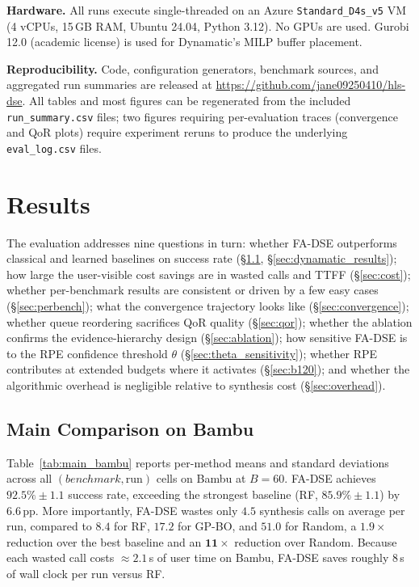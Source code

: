 \documentclass[journal]{IEEEtran}
\begin{document}
\textbf{Hardware.} All runs execute single-threaded on an Azure \texttt{Standard\_D4s\_v5} VM (4 vCPUs, 15\,GB RAM, Ubuntu 24.04, Python 3.12). No GPUs are used. Gurobi 12.0 (academic license) is used for Dynamatic's MILP buffer placement.

\textbf{Reproducibility.} Code, configuration generators, benchmark sources, and aggregated run summaries are released at \url{https://github.com/jane09250410/hls-dse}. All tables and most figures can be regenerated from the included \texttt{run\_summary.csv} files; two figures requiring per-evaluation traces (convergence and QoR plots) require experiment reruns to produce the underlying \texttt{eval\_log.csv} files.


\section{Results}
\label{sec:results}

The evaluation addresses nine questions in turn: whether FA-DSE outperforms classical and learned baselines on success rate (\S\ref{sec:main_results}, \S\ref{sec:dynamatic_results}); how large the user-visible cost savings are in wasted calls and TTFF (\S\ref{sec:cost}); whether per-benchmark results are consistent or driven by a few easy cases (\S\ref{sec:perbench}); what the convergence trajectory looks like (\S\ref{sec:convergence}); whether queue reordering sacrifices QoR quality (\S\ref{sec:qor}); whether the ablation confirms the evidence-hierarchy design (\S\ref{sec:ablation}); how sensitive FA-DSE is to the RPE confidence threshold $\theta$ (\S\ref{sec:theta_sensitivity}); whether RPE contributes at extended budgets where it activates (\S\ref{sec:b120}); and whether the algorithmic overhead is negligible relative to synthesis cost (\S\ref{sec:overhead}).

\subsection{Main Comparison on Bambu}
\label{sec:main_results}

Table~\ref{tab:main_bambu} reports per-method means and standard deviations across all $(benchmark, \text{run})$ cells on Bambu at $B{=}60$. FA-DSE achieves $92.5\% \pm 1.1$ success rate, exceeding the strongest baseline (RF, $85.9\% \pm 1.1$) by $6.6$\,pp. More importantly, FA-DSE wastes only $4.5$ synthesis calls on average per run, compared to $8.4$ for RF, $17.2$ for GP-BO, and $51.0$ for Random, a $\mathbf{1.9\times}$ reduction over the best baseline and an $\mathbf{11\times}$ reduction over Random. Because each wasted call costs $\approx 2.1$\,s of user time on Bambu, FA-DSE saves roughly $8$\,s of wall clock per run versus RF.
\end{document}
